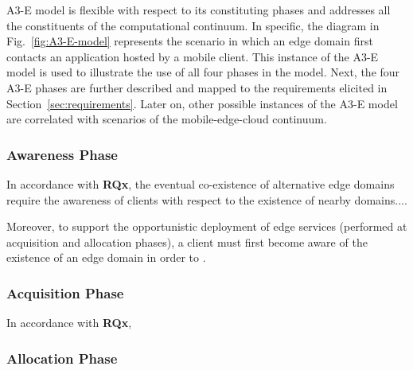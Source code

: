 
A3-E model is flexible with respect to its constituting phases and addresses all the constituents of the computational continuum. In specific, the diagram in Fig.~\ref{fig:A3-E-model} represents the scenario in which an edge domain first contacts an application hosted by a mobile client. This instance of the A3-E model is used to illustrate the use of all four phases in the model. Next, the four A3-E phases are further described and mapped to the requirements elicited in  Section~\ref{sec:requirements}. Later on, other possible instances of the A3-E model are correlated with scenarios of the mobile-edge-cloud continuum.

\subsubsection{Awareness Phase}\label{sec:A3-E-awareness}


In accordance with \textbf{RQx}, the eventual co-existence of alternative edge domains require the awareness of clients with respect to the existence of nearby domains....

Moreover, to support the opportunistic deployment of edge services (performed at acquisition and allocation phases), a client must first become aware of the existence of an edge domain in order to . 

\subsubsection{Acquisition Phase}\label{sec:A3-E-acquisition}

In accordance with \textbf{RQx}, 

\subsubsection{Allocation Phase}\label{sec:A3-E-allocation}

